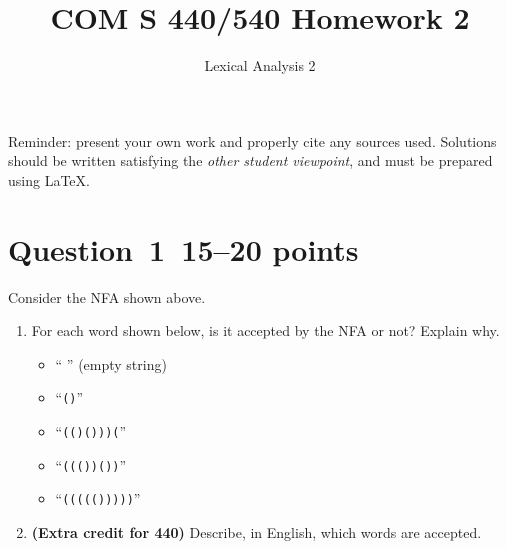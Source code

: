 \documentclass[10pt]{article}
\title{COM S 440/540 Homework 2}
\date{}
\author{Lexical Analysis 2}
\renewcommand{\thepage}{~}
\begin{document}
\maketitle

\noindent
Reminder: present your own work and properly cite any sources used.
Solutions should be written satisfying the \emph{other student viewpoint},
and must be prepared using \LaTeX.
\renewcommand{\thepage}{~}
 
\section*{Question~1~\hfill 15--20 points}

\begin{center}
\end{center}
Consider the NFA shown above.
\begin{enumerate}
\item
For each word shown below, is it accepted by the NFA or not?
Explain why.
\begin{itemize}
  \item `` '' (empty string)
	\item ``{\tt ()}''
	\item ``{\tt (()()))(}''
	\item ``{\tt ((())())}''
	\item ``{\tt ((((()))))}''
\end{itemize}

\item
{\bf (Extra credit for 440) }
Describe, in English, which words are accepted.
\end{enumerate}
\end{document}
